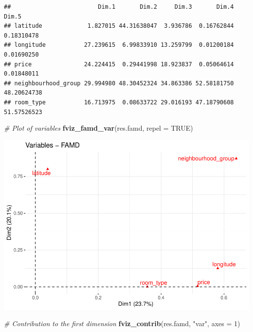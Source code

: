 \documentclass[
]{article}
\newenvironment{Shaded}{\begin{snugshade}}{\end{snugshade}}
\newcommand{\CommentTok}[1]{\textcolor[rgb]{0.56,0.35,0.01}{\textit{#1}}}
\newcommand{\DataTypeTok}[1]{\textcolor[rgb]{0.13,0.29,0.53}{#1}}
\newcommand{\DecValTok}[1]{\textcolor[rgb]{0.00,0.00,0.81}{#1}}
\newcommand{\KeywordTok}[1]{\textcolor[rgb]{0.13,0.29,0.53}{\textbf{#1}}}
\newcommand{\NormalTok}[1]{#1}
\newcommand{\OperatorTok}[1]{\textcolor[rgb]{0.81,0.36,0.00}{\textbf{#1}}}
\newcommand{\OtherTok}[1]{\textcolor[rgb]{0.56,0.35,0.01}{#1}}
\newcommand{\StringTok}[1]{\textcolor[rgb]{0.31,0.60,0.02}{#1}}
\begin{document}
\begin{Shaded}
\end{Shaded}

\begin{verbatim}
##                         Dim.1       Dim.2     Dim.3       Dim.4       Dim.5
## latitude             1.827015 44.31638047  3.936786  0.16762844  0.18310478
## longitude           27.239615  6.99833910 13.259799  0.01200184  0.01690250
## price               24.224415  0.29441998 18.923837  0.05064614  0.01848011
## neighbourhood_group 29.994980 48.30452324 34.863386 52.58181750 48.20624738
## room_type           16.713975  0.08633722 29.016193 47.18790608 51.57526523
\end{verbatim}

\begin{Shaded}
\begin{Highlighting}[]
\CommentTok{# Plot of variables}
\KeywordTok{fviz_famd_var}\NormalTok{(res.famd, }\DataTypeTok{repel =} \OtherTok{TRUE}\NormalTok{)}
\end{Highlighting}
\end{Shaded}

\includegraphics{project-code_files/figure-latex/unnamed-chunk-37-1.pdf}

\begin{Shaded}
\begin{Highlighting}[]
\CommentTok{# Contribution to the first dimension}
\KeywordTok{fviz_contrib}\NormalTok{(res.famd, }\StringTok{"var"}\NormalTok{, }\DataTypeTok{axes =} \DecValTok{1}\NormalTok{)}
\end{Highlighting}
\end{Shaded}
\end{document}
